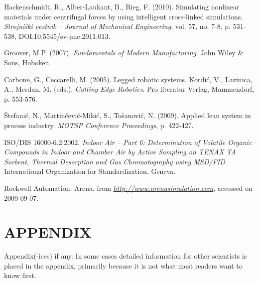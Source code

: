 \documentclass[10pt]{JoME}
\begin{document}
\vspace*{-15pt}
\begin{thebibliography}{99} 

 Hackenschmidt, R., Alber-Laukant, B., Rieg, F. (2010). Simulating nonlinear materials under centrifugal forces by using intelligent cross-linked simulations. \textit{Strojniški vestnik -- Journal of Mechanical Engineering}, vol. 57, no. 7-8, p. 531-538, DOI:10.5545/sv-jme.2011.013.

 Groover, M.P. (2007). \textit{Fundamentals of Modern Manufacturing}. John Wiley \& Sons, Hoboken.

 Carbone, G., Ceccarelli, M. (2005). Legged robotic systems. Kordić, V., Lazinica, A., Merdan, M. (eds.), \textit{Cutting Edge Robotics}. Pro literatur Verlag, Mammendorf, p. 553-576.

 Štefanić, N., Martinčević-Mikić, S., Tošanović, N. (2009). Applied lean system in process industry. \textit{MOTSP Conference Proceedings}, p. 422-427.

 ISO/DIS 16000-6.2:2002. \textit{Indoor Air – Part 6: Determination of Volatile Organic Compounds in Indoor and Chamber Air by Active Sampling on TENAX TA Sorbent, Thermal Desorption and Gas Chromatography using MSD/FID}. International Organization for Standardization. Geneva.

 Rockwell Automation. Arena, from \href{http://www.arenasimulation.com}{\textit{http://www.arenasimulation.com}}, accessed on 2009-09-07.

\end{thebibliography}
\section{APPENDIX}

Appendix(-ices) if any. In some cases detailed information for other scientists is placed in the appendix, primarily because it is not what most readers want to know first.

 
\end{document}
